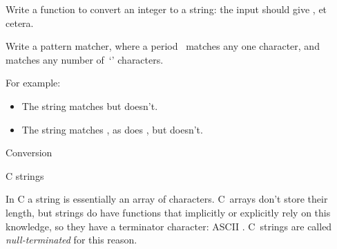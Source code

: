\begin{exercise}
  \label{ex:printnumber}
  Write a function to convert an integer to a string: the input
   should give , et cetera.
\end{exercise}

\begin{exercise}
  Write a pattern matcher, where a period~ matches any one
  character, and  matches any number of~`' characters.

  For example:
  \begin{itemize}
  \item The string  matches  but  doesn't.
  \item The string  matches , as does , but
     doesn't.
  \end{itemize}
\end{exercise}

 {Conversion}


 {C strings}
\label{sec:cstring}

In C a string is essentially an array of characters. C~arrays don't
store their length, but strings do have functions that implicitly or
explicitly rely on this knowledge, so they have a terminator
character: ASCII . C~strings are called
\emph{null-terminated} for this reason.

